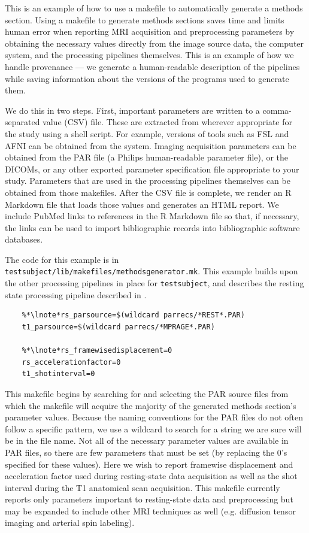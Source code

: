 \label{sec:provenance}
This is an example of how to use a makefile to automatically generate a methods section. Using a makefile to generate methods sections saves time and limits human error when reporting MRI acquisition and preprocessing parameters by obtaining the necessary values directly from the image source data, the computer system, and the processing pipelines themselves. This is an example of how we handle provenance --- we generate a human-readable description of the pipelines while saving information about the versions of the programs used to generate them. 

We do this in two steps. First, important parameters are written to a comma-separated value (CSV) file. These are extracted from wherever appropriate for the study using a \bashn{} shell script. For example, versions of tools such as FSL and AFNI can be obtained from the system. Imaging acquisition parameters can be obtained from the PAR file (a Philips human-readable parameter file), or the DICOMs, or any other exported parameter specification file appropriate to your study. Parameters that are used in the processing pipelines themselves can be obtained from those makefiles. After the CSV file is complete, we render an R Markdown file that loads those values and generates an HTML report. We include PubMed links to references in the R Markdown file so that, if necessary, the links can be used to import bibliographic records into bibliographic software databases. 

The code for this example is in \texttt{testsubject/lib/makefiles/methodsgenerator.mk}.  This example builds upon the other processing pipelines in place for \texttt{testsubject}, and describes the resting state processing pipeline described in .


\begin{lstlisting}
	%*\lnote*rs_parsource=$(wildcard parrecs/*REST*.PAR)
	t1_parsource=$(wildcard parrecs/*MPRAGE*.PAR)
	
	%*\lnote*rs_framewisedisplacement=0
	rs_accelerationfactor=0
	t1_shotinterval=0
\end{lstlisting}

This makefile begins by  searching for and selecting the PAR source files from which the makefile will acquire the majority of the generated methods section's parameter values. Because the naming conventions for the PAR files do not often follow a specific pattern, we use a wildcard to search for a string we are sure will be in the file name.  Not all of the necessary parameter values are available in PAR files, so there are few parameters that must be set (by replacing the 0's specified for these values). Here we wish to report framewise displacement and acceleration factor used during resting-state data acquisition as well as the shot interval during the T1 anatomical scan acquisition. This makefile currently reports only parameters important to resting-state data and preprocessing but may be expanded to include other MRI techniques as well (e.g. diffusion tensor imaging and arterial spin labeling).

